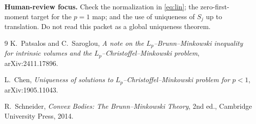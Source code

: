 \documentclass[11pt]{article}
\begin{document}
\medskip
\noindent\textbf{Human-review focus.}
Check the normalization in \eqref{eq:lin}; the zero-first-moment target for
the $p=1$ map; and the use of uniqueness of $S_j$ up to translation.
Do not read this packet as a global uniqueness theorem.

\begin{thebibliography}{9}
K.~Patsalos and C.~Saroglou,
\emph{A note on the $L_p$--Brunn--Minkowski inequality for intrinsic volumes
and the $L_p$--Christoffel--Minkowski problem}, arXiv:2411.17896.

L.~Chen,
\emph{Uniqueness of solutions to $L_p$--Christoffel--Minkowski problem for
$p<1$}, arXiv:1905.11043.

R.~Schneider,
\emph{Convex Bodies: The Brunn--Minkowski Theory}, 2nd ed.,
Cambridge University Press, 2014.
\end{thebibliography}
\end{document}
